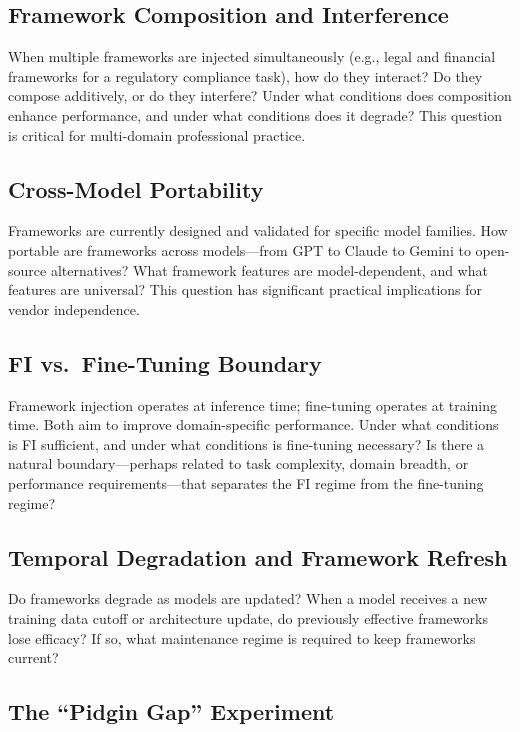 \documentclass[12pt,a4paper]{article}
\begin{document}
\subsection{Framework Composition and Interference}

When multiple frameworks are injected simultaneously (e.g., legal and financial frameworks for a regulatory compliance task), how do they interact? Do they compose additively, or do they interfere? Under what conditions does composition enhance performance, and under what conditions does it degrade? This question is critical for multi-domain professional practice.

\subsection{Cross-Model Portability}

Frameworks are currently designed and validated for specific model families. How portable are frameworks across models---from GPT to Claude to Gemini to open-source alternatives? What framework features are model-dependent, and what features are universal? This question has significant practical implications for vendor independence.

\subsection{FI vs.~Fine-Tuning Boundary}

Framework injection operates at inference time; fine-tuning operates at training time. Both aim to improve domain-specific performance. Under what conditions is FI sufficient, and under what conditions is fine-tuning necessary? Is there a natural boundary---perhaps related to task complexity, domain breadth, or performance requirements---that separates the FI regime from the fine-tuning regime?

\subsection{Temporal Degradation and Framework Refresh}

Do frameworks degrade as models are updated? When a model receives a new training data cutoff or architecture update, do previously effective frameworks lose efficacy? If so, what maintenance regime is required to keep frameworks current?

\subsection{The ``Pidgin Gap'' Experiment}
\end{document}
